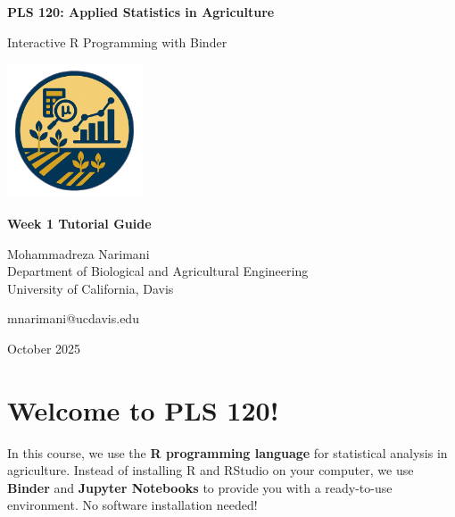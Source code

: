 \documentclass[11pt,a4paper]{article}
\begin{document}
\begin{titlepage}
    \centering
    \vspace*{2cm}
    
    {\Huge\bfseries\color{ucdblue} PLS 120: Applied Statistics in Agriculture}
    
    \vspace{1cm}
    
    {\Large\color{ucdblue} Interactive R Programming with Binder}
    
    \vspace{2cm}
    
    \includegraphics[width=0.3\textwidth]{../../images/logos/Home_Page_Logo.png}
    
    \vspace{2cm}
    
    {\large\bfseries Week 1 Tutorial Guide}
    
    \vspace{1cm}
    
    {\large Mohammadreza Narimani}\\
    {\normalsize Department of Biological and Agricultural Engineering}\\
    {\normalsize University of California, Davis}
    
    \vspace{1cm}
    
    {\normalsize mnarimani@ucdavis.edu}
    
    \vfill
    
    {\normalsize October 2025}
\end{titlepage}

\tableofcontents
\newpage

\section{Welcome to PLS 120!}

In this course, we use the \textbf{R programming language} for statistical analysis in agriculture. Instead of installing R and RStudio on your computer, we use \textbf{Binder} and \textbf{Jupyter Notebooks} to provide you with a ready-to-use environment. No software installation needed!
\end{document}
